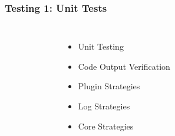\begin{frame}[fragile]
\frametitle{Testing 1: Unit Tests}
\begin{columns}
\begin{figure}[b]
{
\scalebox{0.35}{}
}
\end{figure}
\vspace{3em}
\begin{itemize} %
    \item Unit Testing
    \item Code Output Verification
    \item Plugin Strategies
    \item Log Strategies
    \item Core Strategies
\end{itemize}
\end{columns}
\end{frame}


